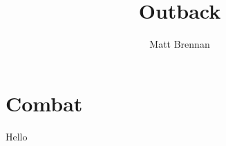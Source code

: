 \documentclass[12pt, a4paper]{book}
\title{Outback}
\author{Matt Brennan}
\begin{document}
\frontmatter
\maketitle
\tableofcontents

\mainmatter
\chapter{Combat}
Hello
\end{document}
